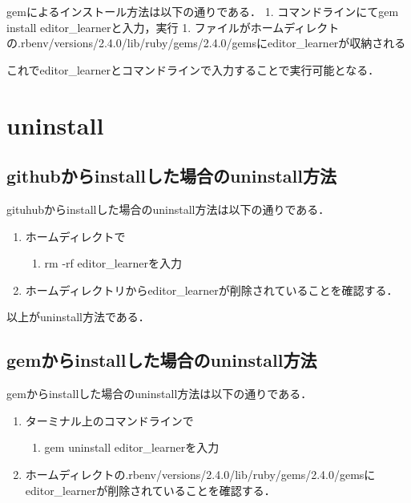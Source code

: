 gemによるインストール方法は以下の通りである． 1. コマンドラインにてgem
install editor\_learnerと入力，実行 1.
ファイルがホームディレクトの.rbenv/versions/2.4.0/lib/ruby/gems/2.4.0/gemsにeditor\_learnerが収納される

これでeditor\_learnerとコマンドラインで入力することで実行可能となる．

    \section{uninstall}\label{uninstall}

\subsection{githubからinstallした場合のuninstall方法}\label{githubux304bux3089installux3057ux305fux5834ux5408ux306euninstallux65b9ux6cd5}

gituhubからinstallした場合のuninstall方法は以下の通りである．

\begin{enumerate}
\def\labelenumi{\arabic{enumi}.}
\tightlist
\item
  ホームディレクトで

  \begin{enumerate}
  \def\labelenumii{\arabic{enumii}.}
  \setcounter{enumii}{1}
  \tightlist
  \item
    rm -rf editor\_learnerを入力
  \end{enumerate}
\item
  ホームディレクトリからeditor\_learnerが削除されていることを確認する．
\end{enumerate}

以上がuninstall方法である．

\subsection{gemからinstallした場合のuninstall方法}\label{gemux304bux3089installux3057ux305fux5834ux5408ux306euninstallux65b9ux6cd5}

gemからinstallした場合のuninstall方法は以下の通りである．

\begin{enumerate}
\def\labelenumi{\arabic{enumi}.}
\tightlist
\item
  ターミナル上のコマンドラインで

  \begin{enumerate}
  \def\labelenumii{\arabic{enumii}.}
  \setcounter{enumii}{1}
  \tightlist
  \item
    gem uninstall editor\_learnerを入力
  \end{enumerate}
\item
  ホームディレクトの.rbenv/versions/2.4.0/lib/ruby/gems/2.4.0/gemsにeditor\_learnerが削除されていることを確認する．
\end{enumerate}

